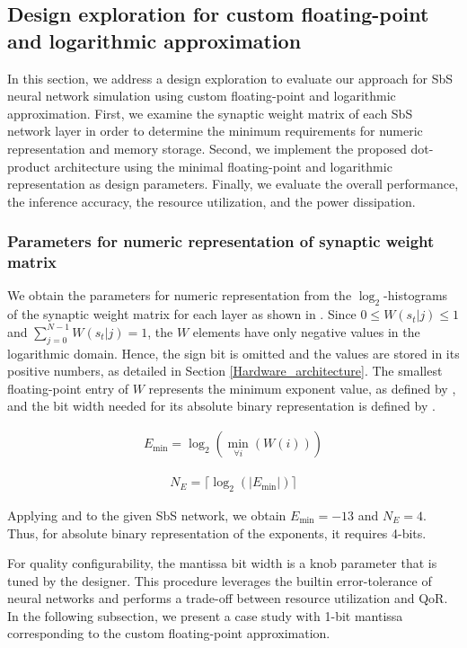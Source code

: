 \subsection{Design exploration for custom floating-point and logarithmic approximation}

In this section, we address a design exploration to evaluate our approach for SbS neural network simulation using custom floating-point and logarithmic approximation. First, we examine the synaptic weight matrix of each SbS network layer in order to determine the minimum requirements for numeric representation and memory storage. Second, we implement the proposed dot-product architecture using the minimal floating-point and logarithmic representation as design parameters. Finally, we evaluate the overall performance, the inference accuracy, the resource utilization, and the power dissipation.

\subsubsection{Parameters for numeric representation of synaptic weight matrix}

We obtain the parameters for numeric representation from the $\log_2$-histograms of the synaptic weight matrix for each layer as shown in . Since $0\le W(s_t|j)\le1$ and $\sum_{j=0}^{N-1}W(s_t|j)=1$, the $W$ elements have only negative values in the logarithmic domain. Hence, the sign bit is omitted and the values are stored in its positive numbers, as detailed in Section \ref{Hardware_architecture}. The smallest floating-point entry of $W$ represents the minimum exponent value, as defined by , and the bit width needed for its absolute binary representation is defined by .

\begin{eqnarray} \label{eq:exp_max}
E_{\min}=\log _2(\min_{\forall i}(W(i)))
\end{eqnarray}

\begin{eqnarray} \label{eq:bits_exp}
N_E=\lceil\log_2(|E_{\min}|)\rceil
\end{eqnarray}

Applying  and  to the given SbS network, we obtain $E_{\min}=-13$ and $N_E=4$. Thus, for absolute binary representation of the exponents, it requires 4-bits.

For quality configurability, the mantissa bit width is a knob parameter that is tuned by the designer. This procedure leverages the builtin error-tolerance of neural networks and performs a trade-off between resource utilization and QoR. In the following subsection, we present a case study with 1-bit mantissa corresponding to the custom floating-point approximation.

